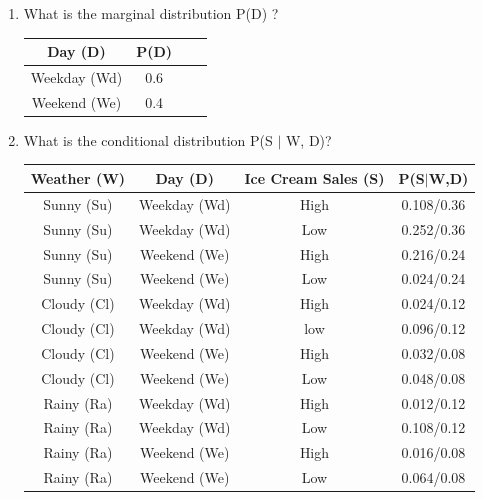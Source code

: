 \documentclass[12pt]{article}
\newenvironment{qparts}{\begin{enumerate}[{(}a{)}]}{\end{enumerate}}
\newenvironment{qsubparts}{\begin{enumerate}[{(}i{)}]}{\end{enumerate}}
\begin{document}
\begin{qparts}
\begin{qsubparts}
    \item What is the marginal distribution  P(D) ?
    \begin{table}[h]
      \centering
      \begin{tabular}{|c|c|c|c|}
        \hline
        Day (D)      & P(D) \\ \hline \hline
        Weekday (Wd) & 0.6  \\ \hline
        Weekend (We) & 0.4  \\ \hline

        \hline
      \end{tabular}
      \label{tab:my_label}
    \end{table}
    \newpage

    \item What is the conditional distribution  P(S $|$ W, D)?
    \begin{table}[h]
      \centering
      \begin{tabular}{|c|c|c|c|}
        \hline
        Weather (W) & Day (D)      & Ice Cream Sales (S) & P(S$|$W,D) \\ \hline \hline
        Sunny (Su)  & Weekday (Wd) & High                & 0.108/0.36 \\ \hline
        Sunny (Su)  & Weekday (Wd) & Low                 & 0.252/0.36 \\ \hline
        Sunny (Su)  & Weekend (We) & High                & 0.216/0.24 \\ \hline
        Sunny (Su)  & Weekend (We) & Low                 & 0.024/0.24 \\ \hline
        Cloudy (Cl) & Weekday (Wd) & High                & 0.024/0.12 \\ \hline
        Cloudy (Cl) & Weekday (Wd) & low                 & 0.096/0.12 \\ \hline
        Cloudy (Cl) & Weekend (We) & High                & 0.032/0.08 \\ \hline
        Cloudy (Cl) & Weekend (We) & Low                 & 0.048/0.08 \\ \hline
        Rainy (Ra)  & Weekday (Wd) & High                & 0.012/0.12 \\ \hline
        Rainy (Ra)  & Weekday (Wd) & Low                 & 0.108/0.12 \\ \hline
        Rainy (Ra)  & Weekend (We) & High                & 0.016/0.08 \\ \hline
        Rainy (Ra)  & Weekend (We) & Low                 & 0.064/0.08 \\ \hline
        \hline
      \end{tabular}
      \label{tab:my_label_5}
    \end{table}
  \end{qsubparts}
  \newpage
  \vspace{5em}


\end{qparts}
\end{document}
